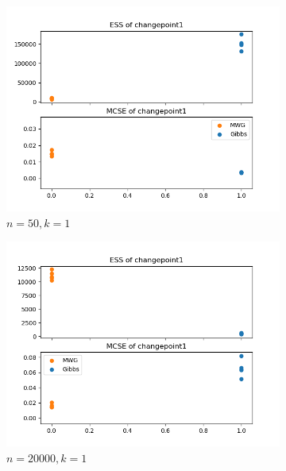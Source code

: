 \begin{figure}[H]
    \centering
    \begin{subfigure}{.3\textwidth}
    	\centering
        \includegraphics[width=\linewidth]{../../plots/ess_se_M2_N50_NMCMC1_seed0_diffind2.png}
        \caption{$n=50, k=1$}
    \end{subfigure}
    \begin{subfigure}{.3\textwidth}
        \centering
    	\includegraphics[width=\linewidth]{../../plots/ess_se_M2_N20000_NMCMC3_seed0_diffind2.png}
    	\caption{$n=20000, k=1$}
	\end{subfigure}
	\begin{subfigure}{.3\textwidth}
	    \centering

\end{subfigure}
\end{figure}
